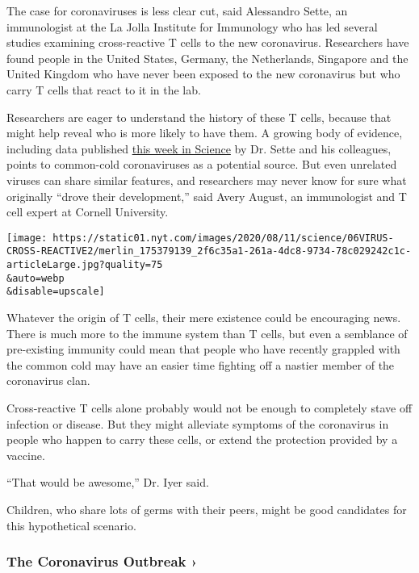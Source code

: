 The case for coronaviruses is less clear cut, said Alessandro Sette, an
immunologist at the La Jolla Institute for Immunology who has led
several studies examining cross-reactive T cells to the new coronavirus.
Researchers have found people in the United States, Germany, the
Netherlands, Singapore and the United Kingdom who have never been
exposed to the new coronavirus but who carry T cells that react to it in
the lab.

Researchers are eager to understand the history of these T cells,
because that might help reveal who is more likely to have them. A
growing body of evidence, including data published
\href{https://science.sciencemag.org/content/early/2020/08/04/science.abd3871}{this
week in Science} by Dr. Sette and his colleagues, points to common-cold
coronaviruses as a potential source. But even unrelated viruses can
share similar features, and researchers may never know for sure what
originally ``drove their development,'' said Avery August, an
immunologist and T cell expert at Cornell University.

\texttt{[image: https://static01.nyt.com/images/2020/08/11/science/06VIRUS-CROSS-REACTIVE2/merlin\_175379139\_2f6c35a1-261a-4dc8-9734-78c029242c1c-articleLarge.jpg?quality=75\\\&auto=webp\\\&disable=upscale]}

Whatever the origin of T cells, their mere existence could be
encouraging news. There is much more to the immune system than T cells,
but even a semblance of pre-existing immunity could mean that people who
have recently grappled with the common cold may have an easier time
fighting off a nastier member of the coronavirus clan.

Cross-reactive T cells alone probably would not be enough to completely
stave off infection or disease. But they might alleviate symptoms of the
coronavirus in people who happen to carry these cells, or extend the
protection provided by a vaccine.

``That would be awesome,'' Dr. Iyer said.

Children, who share lots of germs with their peers, might be good
candidates for this hypothetical scenario.

\href{https://www.nytimes.com/news-event/coronavirus?action=click\&pgtype=Article\&state=default\&region=MAIN_CONTENT_3\&context=storylines_faq}{}

\hypertarget{the-coronavirus-outbreak-}{%
\subsubsection{The Coronavirus Outbreak
›}\label{the-coronavirus-outbreak-}}

